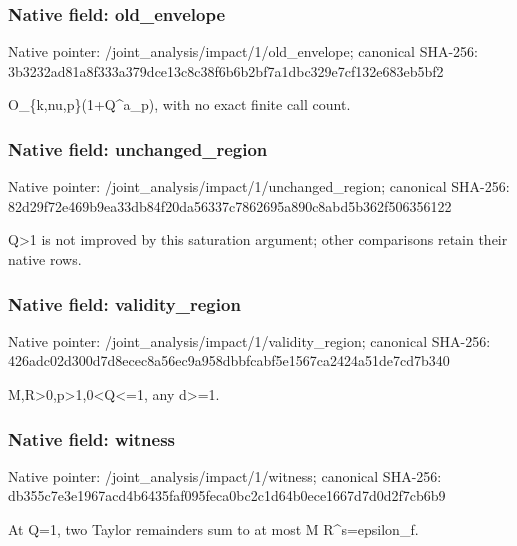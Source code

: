 \documentclass[10pt,a4paper]{article}
\begin{document}
\subsubsection{Native field: old\_\allowbreak{}envelope}
Native pointer: /joint\_\allowbreak{}analysis/impact/1/old\_\allowbreak{}envelope; canonical SHA-256: 3b3232ad81a8f333a379dce13c8c38f6b6b2bf7a1dbc329e7cf132e683eb5bf2

\begingroup\raggedright\sloppy O\_\allowbreak{}\{k,\allowbreak{}nu,\allowbreak{}p\}(1+Q\textasciicircum{}a\_\allowbreak{}p),\allowbreak{} with no exact finite call count.\par\endgroup

\subsubsection{Native field: unchanged\_\allowbreak{}region}
Native pointer: /joint\_\allowbreak{}analysis/impact/1/unchanged\_\allowbreak{}region; canonical SHA-256: 82d29f72e469b9ea33db84f20da56337c7862695a890c8abd5b362f506356122

\begingroup\raggedright\sloppy Q>1 is not improved by this saturation argument;\allowbreak{} other comparisons retain their native rows.\par\endgroup

\subsubsection{Native field: validity\_\allowbreak{}region}
Native pointer: /joint\_\allowbreak{}analysis/impact/1/validity\_\allowbreak{}region; canonical SHA-256: 426adc02d300d7d8ecec8a56ec9a958dbbfcabf5e1567ca2424a51de7cd7b340

\begingroup\raggedright\sloppy M,\allowbreak{}R>0,\allowbreak{}p>1,\allowbreak{}0<Q<=\allowbreak{}1,\allowbreak{} any d>=\allowbreak{}1.\par\endgroup

\subsubsection{Native field: witness}
Native pointer: /joint\_\allowbreak{}analysis/impact/1/witness; canonical SHA-256: db355c7e3e1967acd4b6435faf095feca0bc2c1d64b0ece1667d7d0d2f7cb6b9

\begingroup\raggedright\sloppy At Q=\allowbreak{}1,\allowbreak{} two Taylor remainders sum to at most M R\textasciicircum{}s=\allowbreak{}epsilon\_\allowbreak{}f.\par\endgroup
\end{document}
